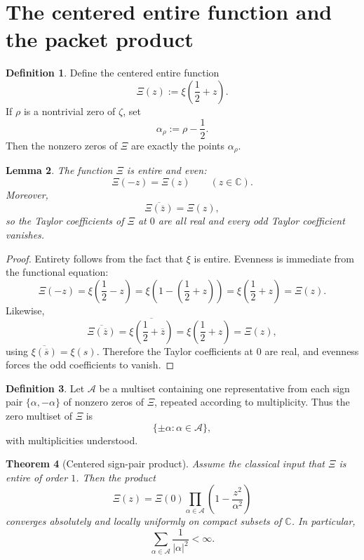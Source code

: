 \documentclass[11pt,a4paper]{article}
\numberwithin{equation}{section}
\newtheorem{theorem}{Theorem}[section]
\newtheorem{lemma}[theorem]{Lemma}
\theoremstyle{definition}
\newtheorem{definition}[theorem]{Definition}
\theoremstyle{remark}
\newcommand{\CC}{\mathbb C}
\begin{document}
\section{The centered entire function and the packet product}

\begin{definition}
Define the centered entire function
\[
\Xi(z):=\xi\!\left(\frac12+z\right).
\]
If $\rho$ is a nontrivial zero of $\zeta$, set
\[
\alpha_\rho:=\rho-\frac12.
\]
Then the nonzero zeros of $\Xi$ are exactly the points $\alpha_\rho$.
\end{definition}

\begin{lemma}\label{P2:lem:Xi-even-and-real}
The function $\Xi$ is entire and even:
\[
\Xi(-z)=\Xi(z)
\qquad (z\in\CC).
\]
Moreover,
\[
\overline{\Xi(\overline z)}=\Xi(z),
\]
so the Taylor coefficients of $\Xi$ at $0$ are all real and every odd Taylor coefficient vanishes.
\end{lemma}

\begin{proof}
Entirety follows from the fact that $\xi$ is entire.  Evenness is immediate from the functional equation:
\[
\Xi(-z)=\xi\!\left(\frac12-z\right)=\xi\!\left(1-\left(\frac12+z\right)\right)=\xi\!\left(\frac12+z\right)=\Xi(z).
\]
Likewise,
\[
\overline{\Xi(\overline z)}=\overline{\xi\!\left(\frac12+\overline z\right)}=\xi\!\left(\frac12+z\right)=\Xi(z),
\]
using $\overline{\xi(\overline s)}=\xi(s)$.  Therefore the Taylor coefficients at $0$ are real, and evenness forces the odd coefficients to vanish.
\end{proof}

\begin{definition}
Let $\mathcal A$ be a multiset containing one representative from each sign pair $\{\alpha,-\alpha\}$ of nonzero zeros of $\Xi$, repeated according to multiplicity.  Thus the zero multiset of $\Xi$ is
\[
\{\pm\alpha:\alpha\in\mathcal A\},
\]
with multiplicities understood.
\end{definition}

\begin{theorem}[Centered sign-pair product]\label{P2:thm:centered-sign-pair-product}
Assume the classical input that $\Xi$ is entire of order $1$.  Then the product
\begin{equation}\label{P2:eq:Xi-sign-pair-product}
\Xi(z)=\Xi(0)\prod_{\alpha\in\mathcal A}\left(1-\frac{z^2}{\alpha^2}\right)
\end{equation}
converges absolutely and locally uniformly on compact subsets of $\CC$.  In particular,
\[
\sum_{\alpha\in\mathcal A}\frac{1}{|\alpha|^2}<\infty.
\]
\end{theorem}
\end{document}
